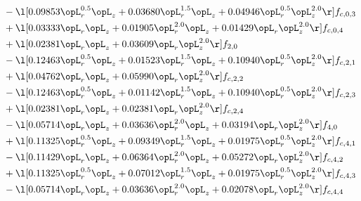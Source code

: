 \begin{alignat}{2}
& - \l[  0.09853 \opL_r^{0.5} \opL_z +  0.03680 \opL_r^{1.5} \opL_z +  0.04946 \opL_r^{0.5} \opL_z^{2.0}  \r] f_{c,0,3} \nonumber \\ 
& + \l[  0.03333 \opL_r \opL_z +  0.01905 \opL_r^{2.0} \opL_z +  0.01429 \opL_r \opL_z^{2.0}  \r] f_{c,0,4} \nonumber \\ 
& + \l[  0.02381 \opL_r \opL_z +  0.03609 \opL_r \opL_z^{2.0}  \r] f_{2,0} \nonumber \\ 
& - \l[  0.12463 \opL_r^{0.5} \opL_z +  0.01523 \opL_r^{1.5} \opL_z +  0.10940 \opL_r^{0.5} \opL_z^{2.0}  \r] f_{c,2,1} \nonumber \\ 
& + \l[  0.04762 \opL_r \opL_z +  0.05990 \opL_r \opL_z^{2.0}  \r] f_{c,2,2} \nonumber \\ 
& - \l[  0.12463 \opL_r^{0.5} \opL_z +  0.01142 \opL_r^{1.5} \opL_z +  0.10940 \opL_r^{0.5} \opL_z^{2.0}  \r] f_{c,2,3} \nonumber \\ 
& + \l[  0.02381 \opL_r \opL_z +  0.02381 \opL_r \opL_z^{2.0}  \r] f_{c,2,4} \nonumber \\ 
& - \l[  0.05714 \opL_r \opL_z +  0.03636 \opL_r^{2.0} \opL_z +  0.03194 \opL_r \opL_z^{2.0}  \r] f_{4,0} \nonumber \\ 
& + \l[  0.11325 \opL_r^{0.5} \opL_z +  0.09349 \opL_r^{1.5} \opL_z +  0.01975 \opL_r^{0.5} \opL_z^{2.0}  \r] f_{c,4,1} \nonumber \\ 
& - \l[  0.11429 \opL_r \opL_z +  0.06364 \opL_r^{2.0} \opL_z +  0.05272 \opL_r \opL_z^{2.0}  \r] f_{c,4,2} \nonumber \\ 
& + \l[  0.11325 \opL_r^{0.5} \opL_z +  0.07012 \opL_r^{1.5} \opL_z +  0.01975 \opL_r^{0.5} \opL_z^{2.0}  \r] f_{c,4,3} \nonumber \\ 
& - \l[  0.05714 \opL_r \opL_z +  0.03636 \opL_r^{2.0} \opL_z +  0.02078 \opL_r \opL_z^{2.0}  \r] f_{c,4,4} \nonumber \\ 
\end{alignat} 


